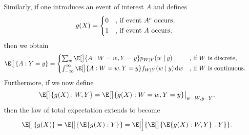 Similarly, if one introduces an event of interest $ A $ and defines
\[ g(X)=\begin{cases*}
        0 & , if event $ A^c $ occurs, \\
        1 & , if event $ A $ occurs,
    \end{cases*} \]
then we obtain
\[ \E[\big]{A\given Y=y}=\begin{cases*}
        \sum_w \E[\big]{A\given W=w, Y=y}p_{W\mid Y}(w\mid y)                         & , if $ W $ is discrete,   \\
        \int_{-\infty}^{\infty}\E[\big]{A\given W=w, Y=y}f_{W\mid Y}(w\mid y)\odif{w} & , if $ W $ is continuous.
    \end{cases*} \]
Furthermore, if we now define
\[ \E[\big]{g(X)\given W,Y}=\E[\big]{g(X)\given W=w,Y=y}\big\rvert_{w=W,y=Y}, \]
then the law of total expectation extends to become
\[ \E[\big]{g(X)}=\E[\big]{\E{g(X)\given Y}}=\E[\Big]{\E[\big]{\E{g(X)\given W,Y}\given Y}}. \]
